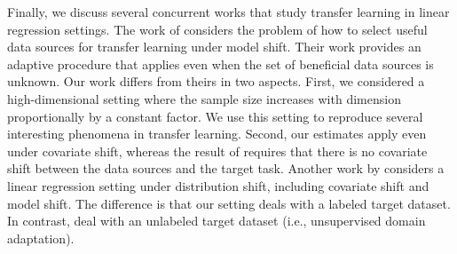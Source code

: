 Finally, we discuss several concurrent works that study transfer learning in linear regression settings.
The work of \citet{li2020transfer} considers the problem of how to select useful data sources for transfer learning under model shift.
Their work provides an adaptive procedure that applies even when the set of beneficial data sources is unknown.
Our work differs from theirs in two aspects.
First, we considered a high-dimensional setting where the sample size increases with dimension proportionally by a constant factor.
We use this setting to reproduce several interesting phenomena in  transfer learning.
Second, our estimates apply even under covariate shift, whereas the result of \citet{li2020transfer} requires that there is no covariate shift between the data sources and the target task.
Another work by \citet{lei2021near} considers a  linear regression setting under distribution shift, including covariate shift and model shift.
The difference is that our setting deals with a labeled target dataset. In contrast, \citet{lei2021near} deal with an unlabeled target dataset (i.e., unsupervised domain adaptation).



